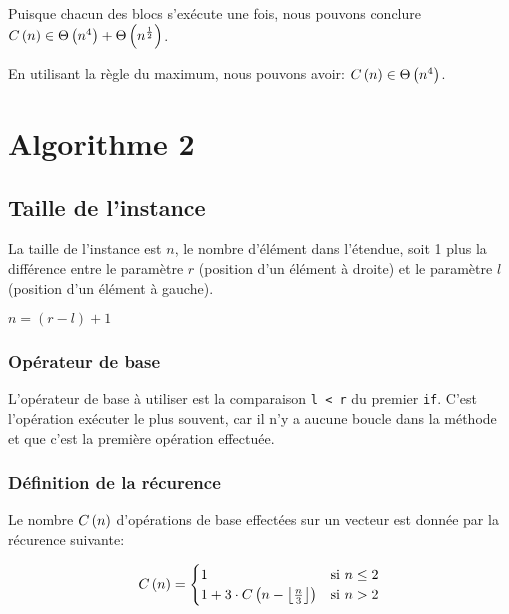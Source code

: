 \documentclass[class=article]{standalone}
\begin{document}
Puisque chacun des blocs s'exécute une fois, nous pouvons conclure
$C\left ( n \right ) \in \Theta\left ( n^4 \right ) + \Theta\left ( n^{\frac{1}{2}} \right )$.

En utilisant la règle du maximum, nous pouvons avoir:
$C\left ( n \right ) \in \Theta\left ( n^4 \right )$.

\pagebreak

\section*{Algorithme 2}
\subsection*{Taille de l'instance}
La taille de l'instance est $n$, le nombre d'élément dans l'étendue, 
soit 1 plus la différence entre 
le paramètre $r$ (position d'un élément à droite) et 
le paramètre $l$ (position d'un élément à gauche).

$n = (r - l) + 1$

\subsubsection*{Opérateur de base}
L'opérateur de base à utiliser est la comparaison \lstinline{l < r} du premier \lstinline{if}.
C'est l'opération exécuter le plus souvent, car il n'y a aucune boucle dans la méthode et que
c'est la première opération effectuée.

\subsubsection*{Définition de la récurence}

Le nombre $C\left ( n \right )$ d'opérations de base effectées sur un vecteur est donnée par la récurence suivante:

\[
  C\left ( n \right ) =
  \begin{cases}
    1 & \text{si } n \leq 2 \\
    1 + 3 \cdot C\left ( n-\left \lfloor \frac{n}{3} \right \rfloor \right ) & \text{si } n > 2 \\
  \end{cases}
\]
\end{document}
